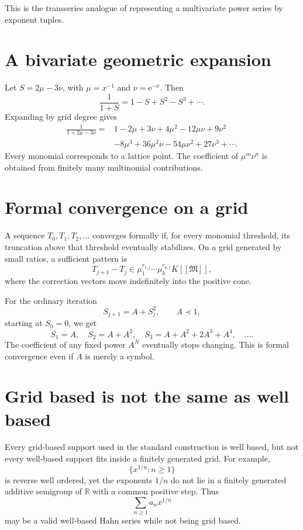 \documentclass[11pt,openany]{book}
\theoremstyle{definition}
\theoremstyle{plain}
\theoremstyle{remark}
\newcommand{\R}{\mathbb{R}}
\newcommand{\M}{\mathfrak{M}}
\newcommand{\e}{\mathrm{e}}
\newcommand{\precdom}{\prec}
\begin{document}
This is the transseries analogue of representing a multivariate power series by exponent tuples.

\section{A bivariate geometric expansion}

Let $S=2\mu-3\nu$, with $\mu=x^{-1}$ and $\nu=\e^{-x}$. Then
\[
 \frac1{1+S}=1-S+S^2-S^3+\cdots.
\]
Expanding by grid degree gives
\begin{align*}
 \frac1{1+2\mu-3\nu}
 ={}&1-2\mu+3\nu+4\mu^2-12\mu\nu+9\nu^2\\
 &-8\mu^3+36\mu^2\nu-54\mu\nu^2+27\nu^3+\cdots.
\end{align*}
Every monomial corresponds to a lattice point. The coefficient of $\mu^m\nu^n$ is obtained from finitely many multinomial contributions.

\section{Formal convergence on a grid}

A sequence $T_0,T_1,T_2,\ldots$ converges formally if, for every monomial threshold, its truncation above that threshold eventually stabilizes. On a grid generated by small ratios, a sufficient pattern is
\[
 T_{j+1}-T_j\in \mu_1^{r_{1,j}}\cdots\mu_k^{r_{k,j}}K[[\M]],
\]
where the correction vectors move indefinitely into the positive cone.

For the ordinary iteration
\[
 S_{j+1}=A+S_j^2,
 \qquad A\precdom1,
\]
starting at $S_0=0$, we get
\[
 S_1=A,
 \quad S_2=A+A^2,
 \quad S_3=A+A^2+2A^3+A^4,
 \quad\ldots.
\]
The coefficient of any fixed power $A^N$ eventually stops changing. This is formal convergence even if $A$ is merely a symbol.

\section{Grid based is not the same as well based}

Every grid-based support used in the standard construction is well based, but not every well-based support fits inside a finitely generated grid. For example,
\[
 \{x^{1/n}:n\ge1\}
\]
is reverse well ordered, yet the exponents $1/n$ do not lie in a finitely generated additive semigroup of $\R$ with a common positive step. Thus
\[
 \sum_{n\ge1}a_nx^{1/n}
\]
may be a valid well-based Hahn series while not being grid based.
\end{document}
